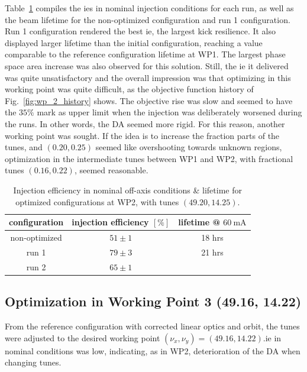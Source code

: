 Table~\ref{tb:wp2summary} compiles the \glspl*{ie} in nominal injection conditions for each run, as well as the beam lifetime for the non-optimized configuration and run 1 configuration. Run 1 configuration rendered the best \gls*{ie}, the largest kick resilience. It also displayed larger lifetime than the initial configuration, reaching a value comparable to the reference configuration lifetime at \gls*{WP1}. The largest phase space area increase was also observed for this solution. Still, the \gls*{ie} it delivered was quite unsatisfactory and the overall impression was that optimizing in this working point was quite difficult, as the objective function history of Fig.~\ref{fig:wp_2_history} shows. The objective rise was slow and seemed to have the $35\%$ mark as upper limit when the injection was deliberately worsened during the runs. In other words, the \gls*{DA} seemed more rigid. For this reason, another working point was sought. If the idea is to increase the fraction parts of the tunes, and $(0.20, 0.25)$ seemed like overshooting towards unknown regions, optimization in the intermediate tunes between \gls*{WP1} and \gls*{WP2}, with fractional tunes $(0.16, 0.22)$, seemed reasonable.
\begin{table}[htb]
    \centering
    \caption[Injection efficiency in nominal off-axis conditions \& lifetime for optimized configurations at WP2, with tunes $(49.20, 14.25)$.]{Injection efficiency in nominal off-axis conditions \& lifetime for optimized configurations at WP2, with tunes $(49.20, 14.25)$.}
    \begin{tabular}{ccc}
    \hline
    configuration & injection efficiency $[\%]$ & lifetime @ $\unit{60~\milli\ampere}$ \\ \hline
    non-optimized    & $51\pm1$                 &  18 hrs \\
    run 1            & $79\pm3$                 &  21 hrs  \\
    run 2            & $65\pm1$                 &           \\ \hline
    \end{tabular}
    \label{tb:wp2summary}
    \end{table}
\subsection{Optimization in Working Point 3 (49.16, 14.22)}
From the reference configuration with corrected linear optics and orbit, the tunes were adjusted to the desired working point $(\nu_x, \nu_y)=(49.16, 14.22)$.\gls*{ie} in nominal conditions was low, indicating, as in \gls*{WP2}, deterioration of the \gls*{DA} when changing tunes.

